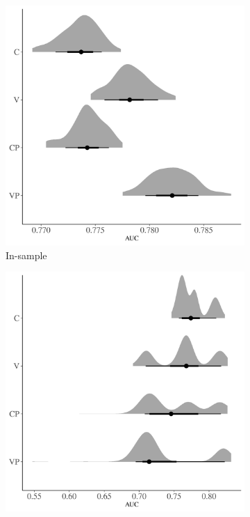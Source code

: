 \documentclass[12pt,letterpaper]{article}
\begin{document}
\begin{figure}[ht]
  \begin{subfigure}[ht]{0.45\textwidth}
    \includegraphics[width=\textwidth,height=0.5\textheight,keepaspectratio=true]{../results/figure/auc_hist_full}
    \caption{In-sample}
    \label{fig:auc_hist}
  \end{subfigure}
  \begin{subfigure}[ht]{0.45\textwidth}
    \includegraphics[width=\textwidth,height=0.5\textheight,keepaspectratio=true]{../results/figure/fold_auc_full}

\end{subfigure}
\end{figure}
\end{document}
